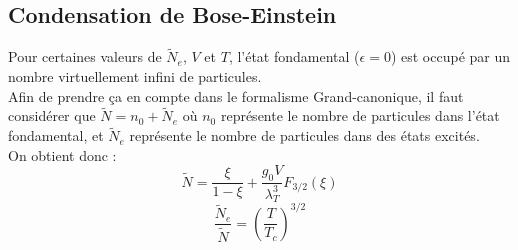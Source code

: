 \documentclass{article}
\newcommand{\insertslide}[3]{
\begin{center}
    \fbox{\texttt{[image: \#1]}}
\end{center}
}
\begin{document}
    \subsection{Condensation de Bose-Einstein}
        Pour certaines valeurs de $\tilde N_e$, $V$ et $T$, l'état fondamental ($\epsilon = 0$) est occupé par un nombre virtuellement infini de particules.\\
        Afin de prendre ça en compte dans le formalisme Grand-canonique, il faut considérer que $\tilde N = n_0 + \tilde N_e$ où $n_0$ représente le nombre de particules dans l'état fondamental, et $\tilde N_e$ représente le nombre de particules dans des états excités.\\
        On obtient donc :
        $$
        \tilde N = \frac{\xi}{1-\xi} + \frac{g_0 V}{\lambda_T^3} F_{3/2}(\xi)
        $$
        $$
        \frac{\tilde N_e}{\tilde N} = \left(\frac{T}{T_c}\right)^{3/2}
        $$
        \insertslide{Slides/CM5}{12}{.4}
\end{document}
